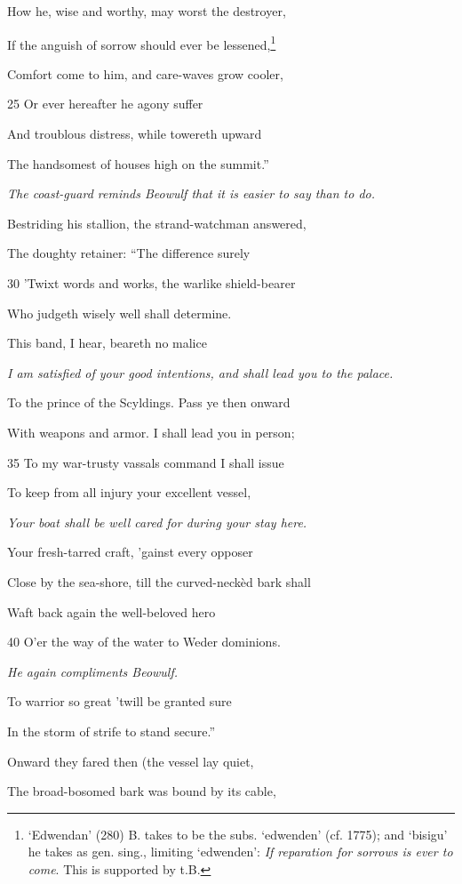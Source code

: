 How he, wise and worthy, may worst the destroyer,

If the anguish of sorrow should ever be lessened,\footnote{‘Edwendan’ (280) B. takes to be the subs. ‘edwenden’ (cf. 1775); and
‘bisigu’ he takes as gen. sing., limiting ‘edwenden’: \emph{If reparation for
sorrows is ever to come}. This is supported by t.B.}

Comfort come to him, and care-waves grow cooler,

25
Or ever hereafter he agony suffer

And troublous distress, while towereth upward

The handsomest of houses high on the summit.”

\emph{The coast-guard
reminds Beowulf
that it is easier to
say than to do.}

Bestriding his stallion, the strand-watchman answered,

The doughty retainer: “The difference surely

30
’Twixt words and works, the warlike shield-bearer

Who judgeth wisely well shall determine.

This band, I hear, beareth no malice

\emph{I am satisfied of
your good intentions,
and shall lead
you to the palace.}

To the prince of the Scyldings. Pass ye then onward

With weapons and armor. I shall lead you in person;

35
To my war-trusty vassals command I shall issue

To keep from all injury your excellent vessel,

\emph{Your boat shall be
well cared for during
your stay here.}

Your fresh-tarred craft, ’gainst every opposer

Close by the sea-shore, till the curved-neckèd bark shall

Waft back again the well-beloved hero

40
O’er the way of the water to Weder dominions.

\emph{He again compliments
Beowulf.}

To warrior so great ’twill be granted sure

In the storm of strife to stand secure.”

Onward they fared then (the vessel lay quiet,

The broad-bosomed bark was bound by its cable,

